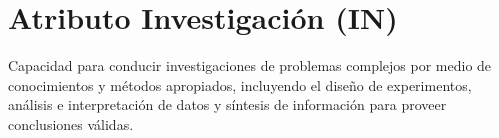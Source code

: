 \section{Atributo Investigación (IN)}

Capacidad para conducir investigaciones de problemas complejos por medio de conocimientos y métodos apropiados, incluyendo el diseño de experimentos, análisis e interpretación de datos y síntesis de información para proveer conclusiones válidas.
